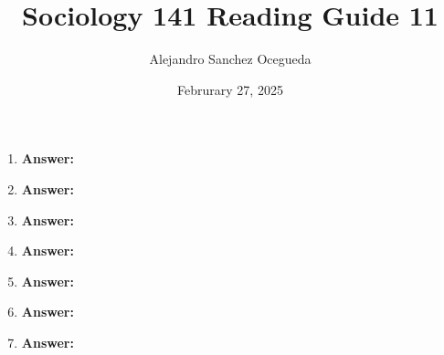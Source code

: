 \documentclass{article}
\title{Sociology 141 Reading Guide 11}
\author{Alejandro Sanchez Ocegueda}
\date{Februrary 27, 2025}
\newcommand{\answer}{\textbf{Answer:}$\;$}
\begin{document}
\maketitle

\begin{enumerate}[label=\arabic*)]
    \item 
    
    \answer 
    
    \item 
    
    \answer 
    
    
    \item 
   

    \answer
    
    \item 
    
    \answer 
    
    \item 
    
    \answer
    

    \item 
    
    \answer
    
    \item 
    
    \answer
    
\end{enumerate}
 
\end{document}
